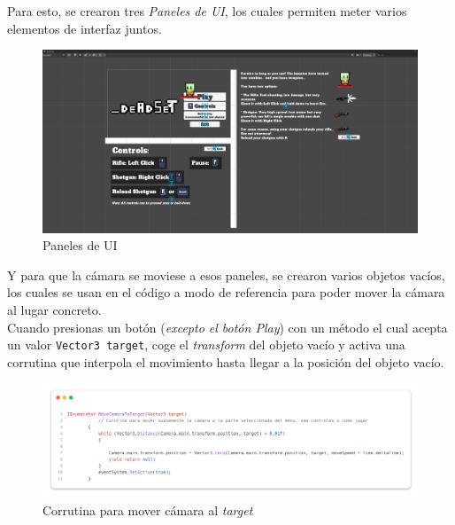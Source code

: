 \documentclass[11pt]{article}
\begin{document}
        Para esto, se crearon tres \textit{Paneles de UI}, los cuales permiten meter varios elementos de interfaz juntos.\\
        \begin{figure}[H]
            \centering
            \includegraphics[width=\textwidth]{Images/Menuprincipal/Paneles.png}
            \caption{Paneles de UI}
        \end{figure}

        Y para que la cámara se moviese a esos paneles, se crearon varios objetos vacíos, los cuales se usan en el código a modo de referencia para poder mover la cámara al lugar concreto. \\
        Cuando presionas un botón (\textit{excepto el botón Play}) con un método el cual acepta un valor \texttt{Vector3 target}, coge el \textit{transform} del objeto vacío y activa una corrutina que interpola el movimiento hasta llegar a la posición del objeto vacío. \\
        \begin{figure}[H]
            \centering
            \includegraphics[width=\textwidth]{Images/Menuprincipal/corutinacamara.png}
            \caption{Corrutina para mover cámara al \textit{target}}
        \end{figure}

    \newpage
\end{document}
